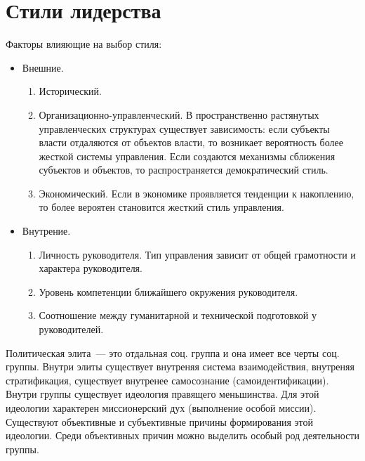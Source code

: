 \section{Стили лидерства}
Факторы влияющие на выбор стиля:
\begin{itemize}
	\item Внешние.
	\begin{enumerate}
		\item Исторический.
		\item Организационно-управленческий. В пространственно растянутых управленческих структурах существует зависимость: если субъекты власти отдаляются от объектов власти, то возникает вероятность более жесткой системы управления. Если создаются механизмы сближения субъектов и объектов, то распространяется демократический стиль.
		\item Экономический. Если в экономике проявляется тенденции к накоплению, то более вероятен становится жесткий стиль управления.
	\end{enumerate}
	\item Внутрение.
	\begin{enumerate}
		\item Личность руководителя. Тип управления зависит от общей грамотности и характера руководителя.
		\item Уровень компетенции ближайшего окружения руководителя.
		\item Соотношение между гуманитарной и технической подготовкой у руководителей.
	\end{enumerate}
\end{itemize}

Политическая элита~--- это отдальная соц. группа и она имеет все черты соц. группы. Внутри элиты существует внутреняя система взаимодействия, внутреняя стратификация, существует внутренее самосознание (самоидентификации). Внутри группы существует идеология правящего меньшинства. Для этой идеологии характерен миссионерский дух (выполнение особой миссии). Существуют объективные и субъективные причины формирования этой идеологии. Среди объективных причин можно выделить особый род деятельности группы.